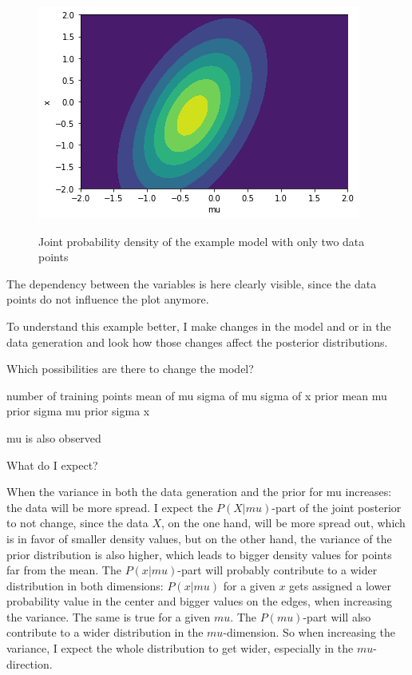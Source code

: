 \documentclass{article}
\begin{document}
\begin{figure}
	\includegraphics[width=\textwidth]{images/ground_truth_joint_posterior_2.png}
	\label{fig:ground_truth_joint_posterior_2}
	\caption[Joint probability density of the example model with only two data points]{Joint probability density of the example model with only two data points}
\end{figure}
The dependency between the variables is here clearly visible, since the data points do not influence the plot anymore.

To understand this example better, I make changes in the model and or in the data generation and look how those changes affect the posterior distributions. 

Which possibilities are there to change the model? 

number of training points
mean of mu
sigma of mu
sigma of x
prior mean mu
prior sigma mu
prior sigma x

mu is also observed


What do I expect? 

When the variance in both the data generation and the prior for mu increases: the data will be more spread. I expect the $P(X|mu)$-part of the joint posterior to not change, since the data $X$, on the one hand, will be more spread out, which is in favor of smaller density values, but on the other hand, the variance of the prior distribution is also higher, which leads to bigger density values for points far from the mean. The $P(x|mu)$-part will probably contribute to a wider distribution in both dimensions: $P(x|mu)$ for a given $x$ gets assigned a lower probability value in the center and bigger values on the edges, when increasing the variance. The same is true for a given $mu$. The $P(mu)$-part will also contribute to a wider distribution in the $mu$-dimension.
So when increasing the variance, I expect the whole distribution to get wider, especially in the $mu$-direction.
\end{document}
